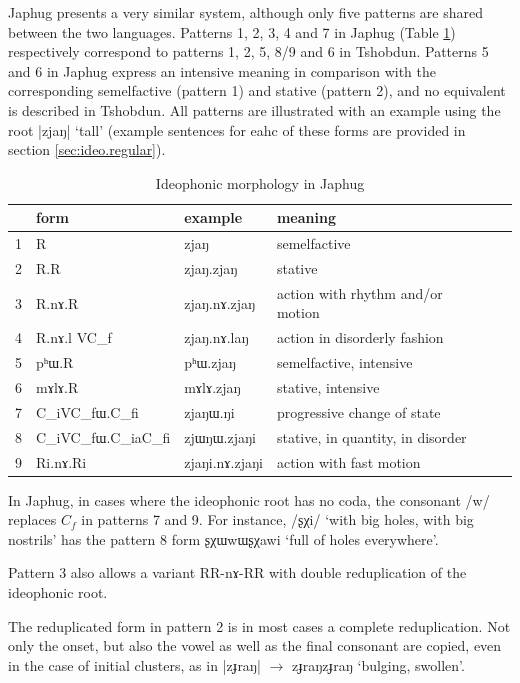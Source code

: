 \documentclass[oldfontcommands,oneside,a4paper,11pt]{article}
\newcommand{\ipa}[1]{{\phon \mbox{#1}}} %
\begin{document}
Japhug presents a very similar system, although only five  patterns are shared between the two languages. Patterns 1, 2, 3, 4 and 7 in Japhug (Table \ref{tab:ideo.morpho1}) respectively correspond to patterns 1, 2, 5, 8/9 and 6 in Tshobdun. Patterns 5 and 6 in Japhug express an intensive meaning in comparison with the corresponding semelfactive (pattern 1) and stative (pattern 2), and  no equivalent is described in Tshobdun. All patterns are illustrated with an example using the root |\ipa{zjaŋ}|  `tall' (example sentences for eahc of these forms are provided in section \ref{sec:ideo.regular}).



\begin{table}[h]
\caption{Ideophonic morphology in Japhug} \label{tab:ideo.morpho1}
\begin{tabular}{llllll}
\toprule
&form & example& meaning  \\
\midrule
1&R& \ipa{zjaŋ} &semelfactive \\
2&R.R& \ipa{zjaŋ.zjaŋ} &stative \\
3&R.\ipa{nɤ}.R & \ipa{zjaŋ.nɤ.zjaŋ} & action with rhythm and/or motion \\
4&R.\ipa{nɤ.l} VC_f & \ipa{zjaŋ.nɤ.laŋ}&   action in disorderly fashion \\
5&\ipa{pʰɯ}.R & \ipa{pʰɯ.zjaŋ} & semelfactive, intensive \\
6&\ipa{mɤlɤ}.R & \ipa{mɤlɤ.zjaŋ} & stative, intensive \\
7&C_iVC_f\ipa{ɯ}.C_f\ipa{i} & \ipa{zjaŋɯ.ŋi} &progressive change of state  \\
8&C_iVC_f\ipa{ɯ}.C_i\ipa{a}C_f\ipa{i} &  \ipa{zjɯŋɯ.zjaŋi} & stative, in quantity, in disorder\\
9&R\ipa{i}.\ipa{nɤ}.R\ipa{i} & \ipa{zjaŋi.nɤ.zjaŋi} & action with fast motion \\
\bottomrule
\end{tabular}
\end{table}

In Japhug, in cases where the ideophonic root has no coda, the consonant /\ipa{w}/ replaces $C_f$ in patterns 7 and 9. For instance, /\ipa{ʂχi}/ `with big holes, with big nostrils' has the pattern 8 form \ipa{ʂχɯwɯʂχawi} `full of holes everywhere'.

Pattern 3 also allows a variant RR-\ipa{nɤ}-RR with double reduplication of the ideophonic root.


The reduplicated form  in pattern 2 is in most cases a complete reduplication. Not only the onset, but also the vowel as well as the final consonant are copied, even in the case of initial clusters, as in |\ipa{zɟraŋ}| $\rightarrow$ \ipa{zɟraŋzɟraŋ} `bulging, swollen'. 
\end{document}

